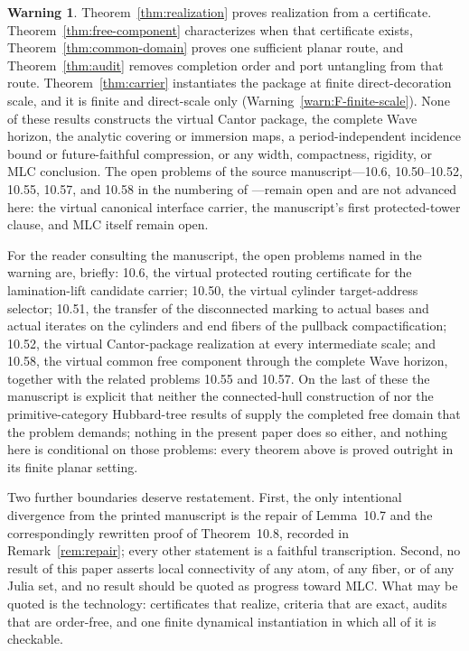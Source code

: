\documentclass[11pt,reqno]{amsart}
\theoremstyle{definition}
\newtheorem{warning}[theorem]{Warning}
\theoremstyle{remark}
\begin{document}
\begin{warning}\label{warn:F-scope}
Theorem~\ref{thm:realization} proves realization from a certificate.
Theorem~\ref{thm:free-component} characterizes when that certificate
exists, Theorem~\ref{thm:common-domain} proves one sufficient planar
route, and Theorem~\ref{thm:audit} removes completion order and port
untangling from that route.  Theorem~\ref{thm:carrier} instantiates the
package at finite direct-decoration scale, and it is finite and
direct-scale only (Warning~\ref{warn:F-finite-scale}).  None of these
results constructs the virtual Cantor package, the complete Wave
horizon, the analytic covering or immersion maps, a period-independent
incidence bound or future-faithful compression, or any width,
compactness, rigidity, or MLC conclusion.  The
open problems of the source manuscript---10.6, 10.50--10.52, 10.55,
10.57, and 10.58 in the numbering of \cite{MWman}---remain open and are
not advanced here: the virtual canonical interface carrier, the
manuscript's first protected-tower clause, and MLC itself remain open.
\end{warning}

For the reader consulting the manuscript, the open problems named in the
warning are, briefly: 10.6, the virtual protected routing certificate for
the lamination-lift candidate carrier; 10.50, the virtual cylinder
target-address selector; 10.51, the transfer of the disconnected marking
to actual bases and actual iterates on the cylinders and end fibers of
the pullback compactification; 10.52, the virtual Cantor-package
realization at every intermediate scale; and 10.58, the virtual common
free component through the complete Wave horizon, together with the
related problems 10.55 and 10.57.  On the last of these the manuscript is explicit
that neither the connected-hull construction of \cite{Dud25} nor the
primitive-category Hubbard-tree results of \cite{KKL26} supply the
completed free domain that the problem demands; nothing in the present
paper does so either, and nothing here is conditional on those problems:
every theorem above is proved outright in its finite planar setting.

Two further boundaries deserve restatement.  First, the only intentional
divergence from the printed manuscript is the repair of Lemma~10.7 and
the correspondingly rewritten proof of Theorem~10.8, recorded in
Remark~\ref{rem:repair}; every other statement is a faithful
transcription.  Second, no result of this paper asserts local
connectivity of any atom, of any fiber, or of any Julia set, and no
result should be quoted as progress toward MLC.  What may be quoted is
the technology: certificates that realize, criteria that are exact,
audits that are order-free, and one finite dynamical instantiation in
which all of it is checkable.
\end{document}
